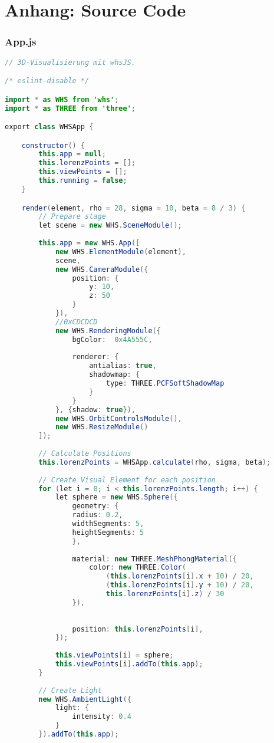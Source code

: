 
\section{Anhang: Source Code}
\subsubsection{App.js}
\begin{lstlisting}[style=C, language=Java]
// 3D-Visualisierung mit whsJS.

/* eslint-disable */

import * as WHS from 'whs';
import * as THREE from 'three';

export class WHSApp {

	constructor() {
		this.app = null;
		this.lorenzPoints = [];
		this.viewPoints = [];
		this.running = false;
	}

	render(element, rho = 28, sigma = 10, beta = 8 / 3) {
		// Prepare stage
		let scene = new WHS.SceneModule();
		
		this.app = new WHS.App([
			new WHS.ElementModule(element),
			scene,
			new WHS.CameraModule({
				position: {
					y: 10,
					z: 50
				}
			}),
			//0xCDCDCD
			new WHS.RenderingModule({
				bgColor:  0x4A555C,
				
				renderer: {
					antialias: true,
					shadowmap: {
						type: THREE.PCFSoftShadowMap
					}
				}
			}, {shadow: true}),
			new WHS.OrbitControlsModule(),
			new WHS.ResizeModule()
		]);
		
		// Calculate Positions
		this.lorenzPoints = WHSApp.calculate(rho, sigma, beta);
		
		// Create Visual Element for each position
		for (let i = 0; i < this.lorenzPoints.length; i++) {
			let sphere = new WHS.Sphere({
				geometry: {
				radius: 0.2,
				widthSegments: 5,
				heightSegments: 5
				},
				
				material: new THREE.MeshPhongMaterial({
					color: new THREE.Color(
						(this.lorenzPoints[i].x + 10) / 20, 
						(this.lorenzPoints[i].y + 10) / 20, 
						this.lorenzPoints[i].z) / 30
				}),
				
				
				position: this.lorenzPoints[i],
			});
			
			this.viewPoints[i] = sphere;
			this.viewPoints[i].addTo(this.app);
		}
		
		// Create Light
		new WHS.AmbientLight({
			light: {
				intensity: 0.4
			}
		}).addTo(this.app);
		

\end{lstlisting}
